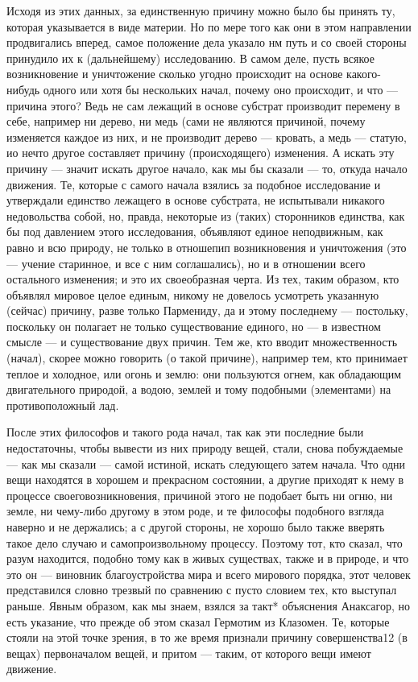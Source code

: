 \documentclass{article}
\begin{document}
Исходя из этих данных, за единственную причину можно было бы принять ту, которая указывается в виде материи. Но по мере того как они в этом направлении продвигались вперед, самое положение дела указало нм путь и со своей стороны принудило их к (дальнейшему) исследованию. В самом деле, пусть всякое возникновение и уничтожение сколько угодно происходит на основе какого-нибудь одного или хотя бы нескольких начал, почему оно происходит, и что --- причина этого? Ведь не сам лежащий в основе субстрат производит перемену в себе, например ни дерево, ни медь (сами не являются причиной, почему изменяется каждое из них, и не производит дерево --- кровать, а медь --- статую, ио нечто другое составляет причину (происходящего) изменения. А искать эту причину --- значит искать другое начало, как мы бы сказали --- то, откуда начало движения. Те, которые с самого начала взялись за подобное исследование и утверждали единство лежащего в основе субстрата, не испытывали никакого недовольства собой, но, правда, некоторые из (таких) сторонников единства, как бы под давлением этого исследования, объявляют единое неподвижным, как равно и всю природу, не только в отношепип возникновения и уничтожения (это --- учение старинное, и все с ним соглашались), но и в отношении всего остального изменения; и это их своеобразная черта. Из тех, таким образом, кто объявлял мировое целое единым, никому не довелось усмотреть указанную (сейчас) причину,
\footnotemark[15]
разве только Пармениду, да и этому последнему --- постольку, поскольку он полагает не только существование единого, но --- в известном смысле --- и существование двух причин.
\footnotemark[16]
Тем же, кто вводит множественность (начал), скорее можно говорить (о такой причине), например тем, кто принимает теплое и холодное, или огонь и землю: они пользуются огнем, как обладающим двигательного природой, а водою, землей и тому подобными (элементами) на противоположный лад.

После этих философов и такого рода начал, так как эти последние были недостаточны, чтобы вывести из них природу вещей, стали, снова побуждаемые --- как мы сказали --- самой истиной, искать следующего затем начала. Что одни вещи находятся в хорошем и прекрасном состоянии, а другие приходят к нему в процессе своеговозникновения, причиной этого не подобает быть ни огню, ни земле, ни чему-либо другому в этом роде, и те философы подобного  взгляда наверно и не держались; а с другой стороны, не хорошо было также вверять такое дело случаю и самопроизвольному процессу. Поэтому тот, кто сказал, что разум находится, подобно тому как в живых существах, также и в природе, и что это он --- виновник благоустройства мира и всего мирового порядка, этот человек представился словно трезвый по сравнению с пусто словием тех, кто выступал раньше. Явным образом, как мы знаем, взялся за такт* объяснения Анаксагор, но есть указание, что прежде об этом сказал Гермотим из Клазомен.
\footnotemark[17]
Те, которые стояли на этой точке зрения, в то же время признали причину совершенства12  (в вещах) первоначалом вещей, и притом --- таким, от которого вещи имеют движение.
\end{document}
